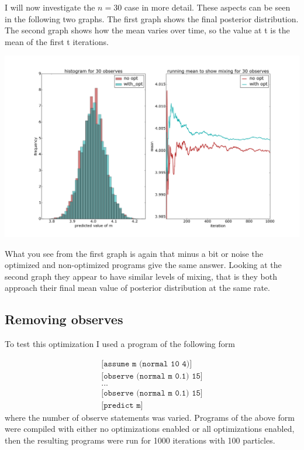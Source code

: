 \documentclass[a4paper]{article}
\begin{document}
I will now investigate the \(n = 30\) case in more detail. These aspects can be seen in the following two graphs. The first graph shows the final posterior distribution. The second graph shows how the mean varies over time, so the value at t is the mean of the first t iterations.

\centerline{\includegraphics[width=16cm]{images/merging_consecutive_observes_2.png}}

What you see from the first graph is again that minus a bit or noise the optimized and non-optimized programs give the same answer. Looking at the second graph they appear to have similar levels of mixing, that is they both approach their final mean value of posterior distribution at the same rate.




\subsection{Removing observes}

To test this optimization I used a program of the following form

\[
	\begin{array}{l}
		\texttt{[assume m (normal 10 4)]} \\
		\texttt{[observe (normal m 0.1) 15]} \\
		\texttt{...} \\
		\texttt{[observe (normal m 0.1) 15]} \\
		\texttt{[predict m]}
	\end{array}
\]
where the number of observe statements was varied. Programs of the above form were compiled with either no optimizations enabled or all optimizations enabled, then the resulting programs were run for 1000 iterations with 100 particles.
\end{document}
